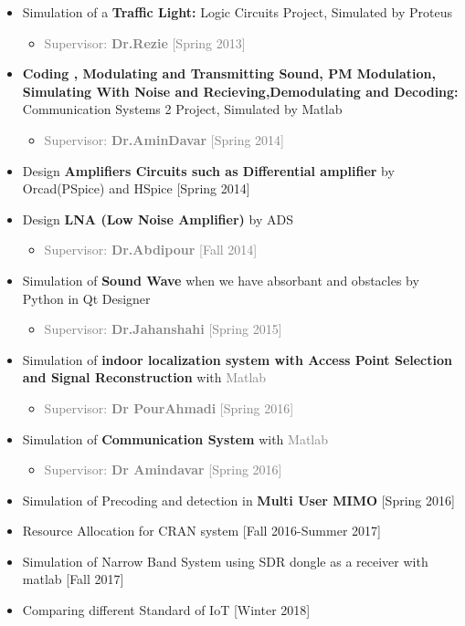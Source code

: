 \documentclass[10pt,a4paper,sans]{moderncv} %
\begin{document}
\begin{itemize}
\item Simulation of a \textbf{ Traffic Light:} Logic Circuits Project, Simulated by Proteus
\begin{itemize}
\item \textcolor{gray}{Supervisor: \textbf{Dr.Rezie} [Spring 2013]}
\end{itemize}

\item \textbf{Coding , Modulating and Transmitting Sound, PM Modulation, Simulating With Noise and Recieving,Demodulating and Decoding:} Communication Systems 2 Project, Simulated by Matlab 
\begin{itemize}
\item \textcolor{gray}{Supervisor: \textbf{Dr.AminDavar} [Spring 2014]}
\end{itemize}

\item Design \textbf{Amplifiers Circuits such as Differential amplifier } by Orcad(PSpice) and HSpice   [Spring 2014] \\
\item Design \textbf{LNA (Low Noise Amplifier)} by ADS
\begin{itemize}
\item \textcolor{gray}{Supervisor: \textbf{Dr.Abdipour} [Fall 2014]}
\end{itemize}
\item Simulation of \textbf{Sound Wave} when we have absorbant and obstacles by Python in Qt Designer
\begin{itemize}
\item \textcolor{gray}{Supervisor: \textbf{Dr.Jahanshahi} [Spring 2015]}
\end{itemize}
\item Simulation of \textbf{ indoor localization system with Access Point Selection and Signal Reconstruction} with \textcolor{gray}{Matlab}
\begin{itemize}
\item \textcolor{gray}{Supervisor: \textbf{Dr PourAhmadi} [Spring 2016]}
\end{itemize}
\item Simulation of  \textbf{Communication System} with \textcolor{gray}{Matlab}
\begin{itemize}
\item \textcolor{gray}{Supervisor: \textbf{Dr Amindavar} [Spring 2016]}
\end{itemize}
\item Simulation of Precoding and detection in   \textbf{Multi User MIMO}  [Spring 2016]
\item Resource Allocation for CRAN system [Fall 2016-Summer 2017]
\item Simulation of Narrow Band System using SDR dongle as a receiver with matlab  [Fall 2017]
\item Comparing different Standard of IoT [Winter 2018]
\end{itemize}
\end{document}
